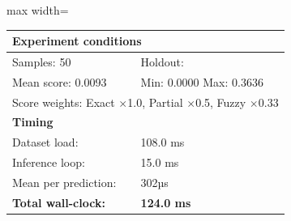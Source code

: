 \begin{table}[htbp]
\begin{adjustbox}{max width=\textwidth}
\begin{tabular}{r p{5cm} r r r r}
\midrule
\multicolumn{6}{l}{\textbf{Experiment conditions}} \\
\midrule
\multicolumn{3}{l}{Samples: 50} & \multicolumn{3}{l}{Holdout: } \\
\multicolumn{3}{l}{Mean score: 0.0093} & \multicolumn{3}{l}{Min: 0.0000 \quad Max: 0.3636} \\
\multicolumn{6}{l}{Score weights: Exact $\times$1.0, Partial $\times$0.5, Fuzzy $\times$0.33} \\
\midrule
\multicolumn{6}{l}{\textbf{Timing}} \\
\midrule
\multicolumn{3}{l}{Dataset load:} & \multicolumn{3}{l}{108.0 ms} \\
\multicolumn{3}{l}{Inference loop:} & \multicolumn{3}{l}{15.0 ms} \\
\multicolumn{3}{l}{Mean per prediction:} & \multicolumn{3}{l}{302µs} \\
\multicolumn{3}{l}{\textbf{Total wall-clock:}} & \multicolumn{3}{l}{\textbf{124.0 ms}} \\
\bottomrule
\end{tabular}
\end{adjustbox}
\end{table}
